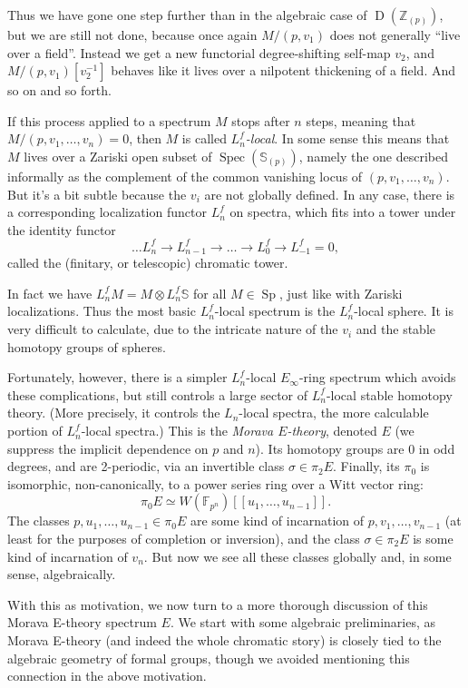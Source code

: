 \documentclass[12pt]{article}
\newcommand{\on}{\operatorname}
\begin{document}
Thus we have gone one step further than in the algebraic case of $\on{D}(\mathbb{Z}_{(p)})$, but we are still not done, because once again $M/(p,v_1)$ does not generally ``live over a field''.  Instead we get a new functorial degree-shifting self-map $v_2$, and $M/(p,v_1)[v_2^{-1}]$ behaves like it lives over a nilpotent thickening of a field.  And so on and so forth.

If this process applied to a spectrum $M$ stops after $n$ steps, meaning that $M/(p,v_1,\ldots, v_n)=0$, then $M$ is called \emph{$L_n^f$-local}.  In some sense this means that $M$ lives over a Zariski open subset of $\on{Spec}(\mathbb{S}_{(p)})$, namely the one described informally as the complement of the common vanishing locus of $(p,v_1,\ldots,v_n)$.  But it's a bit subtle because the $v_i$ are not globally defined.  In any case, there is a corresponding localization functor $L_n^f$ on spectra, which fits into a tower under the identity functor
$$\ldots L_n^f\to L_{n-1}^f \to \ldots \to L_0^f\to L_{-1}^f=0,$$
called the (finitary, or telescopic) chromatic tower.

In fact we have $L_n^fM = M\otimes L_n^f\mathbb{S}$ for all $M\in\on{Sp}$, just like with Zariski localizations.  Thus the most basic $L_n^f$-local spectrum is the $L_n^f$-local sphere.  It is very difficult to calculate, due to the intricate nature of the $v_i$ and the stable homotopy groups of spheres.

Fortunately, however, there is a simpler $L_n^f$-local $E_\infty$-ring spectrum which avoids these complications, but still controls a large sector of $L_n^f$-local stable homotopy theory.  (More precisely, it controls the $L_n$-local spectra, the more calculable portion of $L_n^f$-local spectra.)  This is the \emph{Morava $E$-theory}, denoted $E$ (we suppress the implicit dependence on $p$ and $n$).  Its homotopy groups are $0$ in odd degrees, and are 2-periodic, via an invertible class $\sigma\in\pi_2 E$.  Finally, its $\pi_0$ is isomorphic, non-canonically, to a power series ring over a Witt vector ring:
$$\pi_0 E \simeq W(\mathbb{F}_{p^n})[[u_1,\ldots,u_{n-1}]].$$
The classes $p,u_1,\ldots,u_{n-1}\in \pi_0E$ are some kind of incarnation of $p,v_1,\ldots,v_{n-1}$ (at least for the purposes of completion or inversion), and the class $\sigma\in \pi_2E$ is some kind of incarnation of $v_n$.  But now we see all these classes globally and, in some sense, algebraically.

With this as motivation, we now turn to a more thorough discussion of this Morava E-theory spectrum $E$.  We start with some algebraic preliminaries, as Morava E-theory (and indeed the whole chromatic story) is closely tied to the algebraic geometry of formal groups, though we avoided mentioning this connection in the above motivation.
\end{document}
